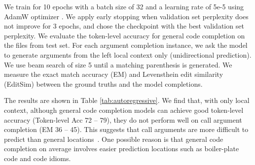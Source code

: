 We train for 10 epochs with a batch size of 32 and a learning rate of 5e-5 using AdamW optimizer \citep{loshchilov2018decoupled}. 
We apply early stopping when validation set perplexity does not improve for 3 epochs, and chose the checkpoint with the best validation set perplexity.
We evaluate the token-level accuracy for general code completion on the files from \CallArgs test set. For each argument completion instance, we ask the model to generate arguments from the left local context only (unidirectional prediction).
We use beam search of size 5 until a matching parenthesis is generated. 
We measure the exact match accuracy (EM) and Levensthein edit similarity (EditSim) between the ground truths and the model completions. 


The results are shown in Table \ref{tab:autoregressive}. 
We find that, with only local context, although general code completion models can achieve good token-level accuracy (Token-level Acc 72 -- 79), they do not perform well on call argument completion (EM 36 -- 45). 
This suggests that call arguments are more difficult to predict than general locations~\citep[cf.][]{rahman2019natural}.
One possible reason is that general code completion on average involves easier prediction locations such as boiler-plate code and code idioms.

